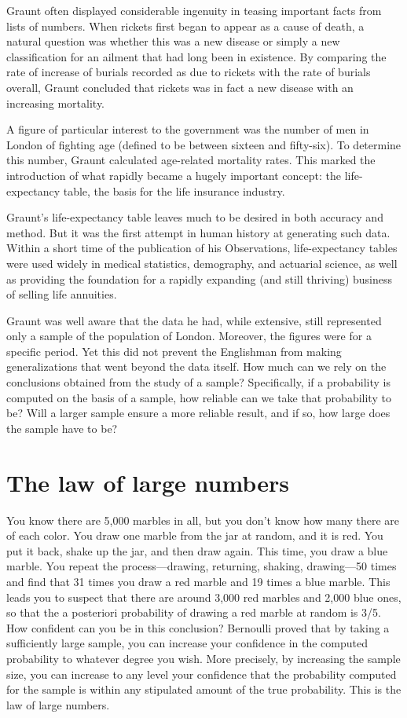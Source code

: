 Graunt often displayed considerable ingenuity in teasing important facts from lists of numbers. When rickets first began to appear as a cause of death, a natural question was whether this was a new disease or simply a new classification for an ailment that had long been in existence. By comparing the rate of increase of burials recorded as due to rickets with the rate of burials overall, Graunt concluded that rickets was in fact a new disease with an increasing mortality.

A figure of particular interest to the government was the number of men in London of fighting age (defined to be between sixteen and fifty-six). To determine this number, Graunt calculated age-related mortality rates. This marked the introduction of what rapidly became a hugely important concept: the life-expectancy table, the basis for the life insurance industry.

Graunt’s life-expectancy table leaves much to be desired in both accuracy and method. But it was the first attempt in human history at generating such data. Within a short time of the publication of his Observations, life-expectancy tables were used widely in medical statistics, demography, and actuarial science, as well as providing the foundation for a rapidly expanding (and still thriving) business of selling life annuities.

Graunt was well aware that the data he had, while extensive, still represented only a sample of the population of London. Moreover, the figures were for a specific period. Yet this did not prevent the Englishman from making generalizations that went beyond the data itself. How much can we rely on the conclusions obtained from the study of a sample? Specifically, if a probability is computed on the basis of a sample, how reliable can we take that probability to be? Will a larger sample ensure a more reliable result, and if so, how large does the sample have to be?

\section{The law of large numbers}
You know there are 5,000 marbles in all, but you don’t know how many there are of each color. You draw one marble from the jar at random, and it is red. You put it back, shake up the jar, and then draw again. This time, you draw a blue marble. You repeat the process—drawing, returning, shaking, drawing—50 times and find that 31 times you draw a red marble and 19 times a blue marble. This leads you to suspect that there are around 3,000 red marbles and 2,000 blue ones, so that the a posteriori probability of drawing a red marble at random is 3/5. How confident can you be in this conclusion? Bernoulli proved that by taking a sufficiently large sample, you can increase your confidence in the computed probability to whatever degree you wish. More precisely, by increasing the sample size, you can increase to any level your confidence that the probability computed for the sample is within any stipulated amount of the true probability. This is the law of large numbers.

